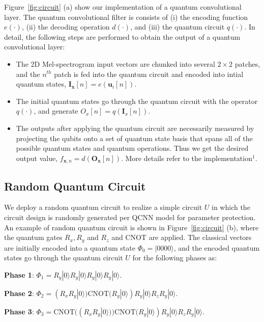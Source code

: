 \documentclass{article}
\begin{document}
Figure~\ref{fig:circuit} (a) show our implementation of a quantum convolutional layer. The quantum convolutional filter is consists of (i) the encoding function $e(\cdot)$, (ii) the decoding operation $d(\cdot)$, and (iii) the quantum circuit $q(\cdot)$. In detail, the following steps are performed to obtain the output of a quantum convolutional layer:
\begin{itemize}
\item The 2D Mel-spectrogram input vectors are chunked into several $2\times 2$ patches, and the $n^{th}$ patch is fed into the quantum circuit and encoded into intial quantum states, $\textbf{I}_{\textbf{x}}[n] = e(\textbf{u}_{i}[n])$. 
\item The initial quantum states go through the quantum circuit with the operator $q(\cdot)$, and generate $O_{x}[n] = q(\textbf{I}_{x}[n])$. 

\item The outputs after applying the quantum circuit are necessarily measured by projecting the qubits onto a set of quantum state basis that spans all of the possible quantum states and quantum operations. Thus we get the desired output value,  $f_{\textbf{x}, n} = d(\textbf{O}_{\textbf{x}}[n])$. More details refer to the implementation$^1$.
\end{itemize}






\vspace{-3mm}
\subsection{Random Quantum Circuit}
We deploy a random quantum circuit to realize a simple circuit $U$ in which the circuit design is randomly generated per QCNN model for parameter protection. An example of random quantum circuit is shown in Figure~\ref{fig:circuit} (b), where the quantum gates $R_{x}, R_{y}$ and $R_{z}$ and CNOT are applied. The classical vectors are initially encoded into a quantum state $\Phi_{0} = |0000\rangle$, and the encoded quantum states go through the quantum circuit $U$ for the following phases as:

\noindent \textbf{Phase 1}: $\Phi_{1} = R_{y}|0\rangle R_{y}|0\rangle R_{y} |0\rangle R_{y} |0\rangle$. 

\noindent \textbf{Phase 2}: $\Phi_{2} = (R_{x}R_{y}|0\rangle) \text{CNOT}(R_{y}|0\rangle)R_{y}|0\rangle R_{z}R_{y}|0\rangle$.

\noindent \textbf{Phase 3}: 
$\Phi_{3} = \text{CNOT}((R_{x}R_{y}|0\rangle)) \text{CNOT}(R_{y}|0\rangle)R_{y}|0\rangle R_{z}R_{y}|0\rangle.$
\end{document}
